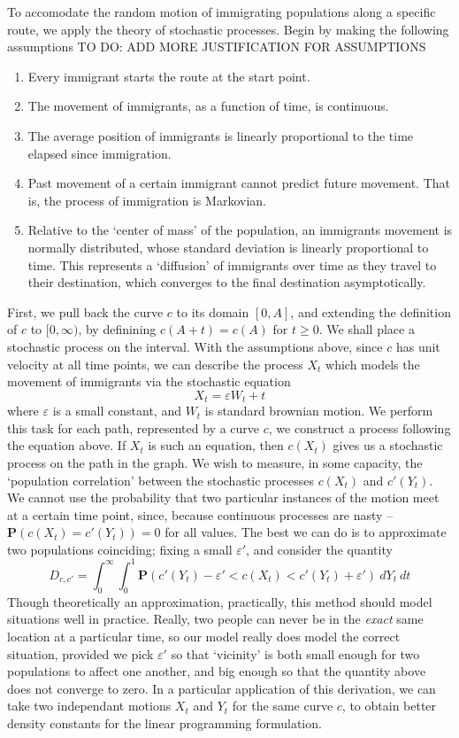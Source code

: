 \documentclass{article}
\begin{document}
To accomodate the random motion of immigrating populations along a specific route, we apply the theory of stochastic processes. Begin by making the following assumptions
%
TO DO: ADD MORE JUSTIFICATION FOR ASSUMPTIONS
%
\begin{enumerate}
    \item Every immigrant starts the route at the start point.
    \item The movement of immigrants, as a function of time, is continuous.
    \item The average position of immigrants is linearly proportional to the time elapsed since immigration.
    \item Past movement of a certain immigrant cannot predict future movement. That is, the process of immigration is Markovian.
    \item Relative to the `center of mass' of the population, an immigrants movement is normally distributed, whose standard deviation is linearly proportional to time. This represents a `diffusion' of immigrants over time as they travel to their destination, which converges to the final destination asymptotically.
\end{enumerate}
%
First, we pull back the curve $c$ to its domain $[0,A]$, and extending the definition of $c$ to $[0,\infty)$, by definining $c(A + t) = c(A)$ for $t \geq 0$. We shall place a stochastic process on the interval. With the assumptions above, since $c$ has unit velocity at all time points, we can describe the process $X_t$ which models the movement of immigrants via the stochastic equation
%
\[ X_t = \varepsilon W_t + t \]
%
where $\varepsilon$ is a small constant, and $W_t$ is standard brownian motion. We perform this task for each path, represented by a curve $c$, we construct a process following the equation above. If $X_t$ is such an equation, then $c(X_t)$ gives us a stochastic process on the path in the graph. We wish to measure, in some capacity, the `population correlation' between the stochastic processes $c(X_t)$ and $c'(Y_t)$. We cannot use the probability that two particular instances of the motion meet at a certain time point, since, because continuous processes are nasty -- $\mathbf{P}(c(X_t) = c'(Y_t)) = 0$ for all values. The best we can do is to approximate two populations coinciding; fixing a small $\varepsilon'$, and consider the quantity
%
\[ D_{c,c'} = \int_0^\infty \int_0^1 \mathbf{P}(c'(Y_t) - \varepsilon' < c(X_t) < c'(Y_t) + \varepsilon')\ dY_t\ dt \]
%
Though theoretically an approximation, practically, this method should model situations well in practice. Really, two people can never be in the {\it exact} same location at a particular time, so our model really does model the correct situation, provided we pick $\varepsilon'$ so that `vicinity' is both small enough for two populations to affect one another, and big enough so that the quantity above does not converge to zero. In a particular application of this derivation, we can take two independant motions $X_t$ and $Y_t$ for the same curve $c$, to obtain better density constants for the linear programming formulation.
\end{document}
